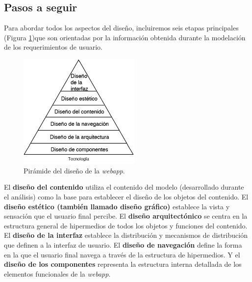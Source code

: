 		\subsection{Pasos a seguir} %
		\label{sub:pasos_a_seguir}
		
			Para abordar todos los aspectos del diseño, incluiremos seis etapas principales (Figura \ref{fig:dis_piramide})que son orientadas por la información obtenida durante la modelación de los requerimientos de usuario. 
		   
		   \begin{figure}[H]
		     \centering
		       \includegraphics[width=6cm]{img/jpg/piramide.jpg}
		     \caption{Pirámide del diseño de la \textit{webapp}.}
		     \label{fig:dis_piramide}
		   \end{figure}
			
			
			El \textbf{diseño del contenido} utiliza el contenido del modelo (desarrollado durante el análisis) como la base para establecer el diseño de los objetos del contenido. El \textbf{diseño estético (también llamado diseño gráfico)} establece la vista y sensación que el usuario final percibe. El \textbf{diseño arquitectónico} se centra en la estructura general de  hipermedios de todos los objetos y funciones del contenido. El \textbf{diseño de la interfaz} establece la distribución y mecanismos de distribución que definen a la interfaz de usuario. El \textbf{diseño de navegación} define la forma en la que el usuario final navega a través de la estructura de hipermedios. Y el \textbf{diseño de los componentes} representa la estructura interna detallada de los elementos funcionales de la \textit{webapp}.
		
	
	
	

